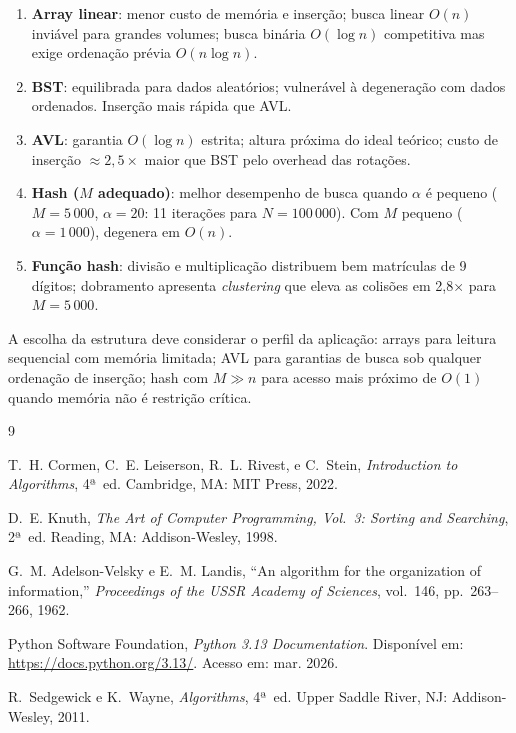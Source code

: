 \documentclass[conference,a4paper]{IEEEtran}
\begin{document}
\begin{enumerate}
  \item \textbf{Array linear}: menor custo de memória e inserção; busca
        linear $O(n)$ inviável para grandes volumes; busca binária
        $O(\log n)$ competitiva mas exige ordenação prévia $O(n\log n)$.

  \item \textbf{BST}: equilibrada para dados aleatórios; vulnerável à
        degeneração com dados ordenados. Inserção mais rápida que AVL.

  \item \textbf{AVL}: garantia $O(\log n)$ estrita; altura próxima do
        ideal teórico; custo de inserção $\approx\!2{,}5\times$ maior
        que BST pelo overhead das rotações.

  \item \textbf{Hash ($M$ adequado)}: melhor desempenho de busca quando
        $\alpha$ é pequeno ($M\!=\!5\,000$, $\alpha\!=\!20$: 11
        iterações para $N\!=\!100\,000$). Com $M$ pequeno ($\alpha\!
        =\!1\,000$), degenera em $O(n)$.

  \item \textbf{Função hash}: divisão e multiplicação distribuem bem
        matrículas de 9 dígitos; dobramento apresenta \textit{clustering}
        que eleva as colisões em 2,8× para $M=5\,000$.
\end{enumerate}

A escolha da estrutura deve considerar o perfil da aplicação: arrays
para leitura sequencial com memória limitada; AVL para garantias de
busca sob qualquer ordenação de inserção; hash com $M\!\gg\!n$ para
acesso mais próximo de $O(1)$ quando memória não é restrição crítica.

\begin{thebibliography}{9}

T.~H. Cormen, C.~E. Leiserson, R.~L. Rivest, e C.~Stein,
\textit{Introduction to Algorithms}, 4ª~ed.
Cambridge, MA: MIT Press, 2022.

D.~E. Knuth,
\textit{The Art of Computer Programming, Vol.~3: Sorting and Searching},
2ª~ed.
Reading, MA: Addison-Wesley, 1998.

G.~M. Adelson-Velsky e E.~M. Landis,
``An algorithm for the organization of information,''
\textit{Proceedings of the USSR Academy of Sciences},
vol.~146, pp.~263--266, 1962.

Python Software Foundation,
\textit{Python 3.13 Documentation}.
Disponível em: \url{https://docs.python.org/3.13/}.
Acesso em: mar. 2026.

R.~Sedgewick e K.~Wayne,
\textit{Algorithms}, 4ª~ed.
Upper Saddle River, NJ: Addison-Wesley, 2011.

\end{thebibliography}
\end{document}
